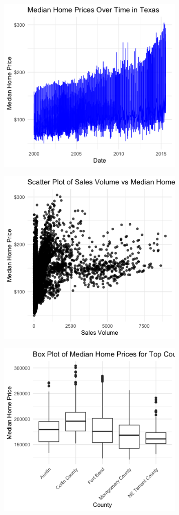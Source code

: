 \documentclass{article}
\begin{document}
\begin{figure}[htp]
    \centering
    \includegraphics[width=9cm]{PS6a_Simpson.png}
\end{figure}

\begin{figure}[htp]
    \centering
    \includegraphics[width=9cm]{PS6b_Simpson.png}
\end{figure}


\begin{figure}[htp]
    \centering
    \includegraphics[width=9cm]{PS6c_Simpson.png}
\end{figure}
\end{document}
